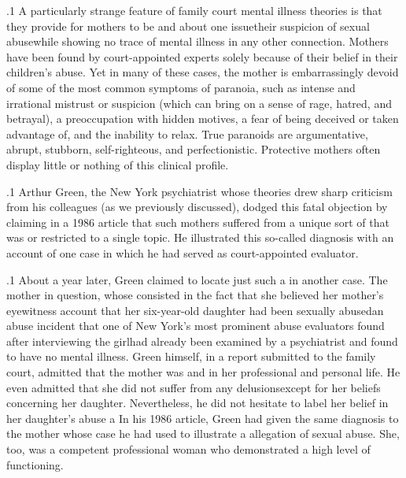 \documentclass[11pt, twoside]{article}
\begin{document}
{\p.1{%
\noindent{}A particularly strange feature of family court mental illness theories
is that they provide for mothers to be  and 
about one issue\mdash{}their suspicion of sexual abuse\mdash{}while showing no
trace of mental illness in any other connection. Mothers have been
found  by court-appointed experts solely because of their
belief in their children’s abuse. Yet in many of these cases, the  mother is embarrassingly devoid of some of the most common symptoms of paranoia, such as intense and irrational mistrust
or suspicion (which can bring on a sense of rage, hatred, and betrayal), a preoccupation with hidden motives, a fear of being deceived or taken advantage of, and the inability to relax. True paranoids
are argumentative, abrupt, stubborn, self-righteous, and perfectionistic. Protective mothers often display little or nothing of this clinical
profile.
}%

\p.1{%
Arthur Green, the New York psychiatrist whose theories drew sharp criticism from his colleagues (as we previously discussed), dodged this fatal
objection by claiming in a 1986 article that such mothers suffered from
a unique sort of  that was  or restricted to a single topic. He illustrated this so-called diagnosis with
an account of one case in which he had served as court-appointed
evaluator.
}%

\p.1{%
About a year later, Green claimed to locate just such a  in another case. The mother in question,
whose  consisted in the fact that she believed her mother’s
eyewitness account that her six-year-old daughter had been sexually
abused\mdash{}an abuse incident that one of New York’s most prominent abuse
evaluators found  after interviewing
the girl\mdash{}had already been examined by a psychiatrist and found to have no
mental illness. Green himself, in a report submitted to the family court,
admitted that the mother was  and  in her professional and personal life. He even admitted that she
did not suffer from any delusions\mdash{}except for her beliefs concerning
her daughter. Nevertheless, he did not hesitate to label her belief in
her daughter’s abuse a  In his 1986 article,
Green had given the same diagnosis to  the mother whose case
he had used to illustrate a  allegation of sexual abuse. She, too,
was a competent professional woman who demonstrated a high level of
functioning.
}%

}
\end{document}
